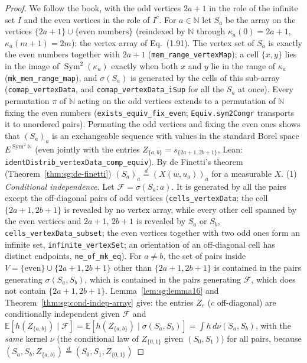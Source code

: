 \begin{proof}
  \leanok
{}
We follow the book, with the odd vertices $2a+1$ in the role of the infinite set $I$ and the even vertices in the role of $I^c$. For $a\in\mathbb N$ let $S_a$ be the array on the vertices $\{2a+1\}\cup\{\text{even numbers}\}$ (reindexed by $\mathbb N$ through
$\kappa_a(0)=2a+1$, $\kappa_a(m+1)=2m$): the vertex array of Eq.~(1.91). The vertex set of $S_a$ is exactly the even numbers together with $2a+1$ (\texttt{mem\_range\_vertexMap}); a cell $\{x,y\}$ lies in the image of $\operatorname{Sym}^2(\kappa_a)$ exactly when both $x$ and $y$ lie in the range of $\kappa_a$ (\texttt{mk\_mem\_range\_map}), and $\sigma(S_a)$ is generated by the cells of this sub-array (\texttt{comap\_vertexData}, and \texttt{comap\_vertexData\_iSup} for all the $S_a$ at once). Every permutation $\pi$ of $\mathbb N$ acting on the odd vertices extends to a permutation of $\mathbb N$ fixing the even numbers (\texttt{exists\_equiv\_fix\_even}; \texttt{Equiv.sym2Congr} transports it to unordered pairs). Permuting the odd vertices and fixing the even ones shows that $(S_a)_a$ is an exchangeable sequence with values in the standard Borel space $E^{\operatorname{Sym}^2\mathbb N}$ (even jointly with the entries
$Z_{\{a,b\}}=s_{\{2a+1,2b+1\}}$, Lean: \texttt{identDistrib\_vertexData\_comp\_equiv}). By de Finetti's theorem (Theorem~\ref{thm:sg:de-finetti}) $(S_a)_a\overset d=(X(w,u_a))_a$ for a measurable $X$.
(1) \emph{Conditional independence.} Let $\mathscr F=\sigma(S_a:a)$. It is generated by all the pairs except the off-diagonal pairs of odd vertices (\texttt{cells\_vertexData}: the cell $\{2a+1,2b+1\}$ is revealed by no vertex array, while every other cell spanned by the even vertices and $2a+1$, $2b+1$ is revealed by $S_a$ or $S_b$, \texttt{cells\_vertexData\_subset}; the even vertices together with two odd ones form an infinite set, \texttt{infinite\_vertexSet}; an orientation of an off-diagonal cell has distinct endpoints, \texttt{ne\_of\_mk\_eq}). For $a\ne b$, the set of pairs inside $V=\{\text{even}\}\cup\{2a+1,2b+1\}$ other than $\{2a+1,2b+1\}$ is contained in the pairs
generating $\sigma(S_a,S_b)$, which is contained in the pairs generating $\mathscr F$, which does not contain $\{2a+1,2b+1\}$. Lemma~\ref{lem:sg:lemma16} and Theorem~\ref{thm:sg:cond-indep-array} give: the entries $Z_c$ ($c$ off-diagonal) are conditionally independent given $\mathscr F$ and
$\mathbb E[h(Z_{\{a,b\}})\mid\mathscr F]=\mathbb E[h(Z_{\{a,b\}})\mid\sigma(S_a,S_b)]=\int h\,d\nu(S_a,S_b)$, with the \emph{same} kernel $\nu$ (the conditional law of $Z_{\{0,1\}}$ given $(S_0,S_1)$) for all pairs, because $(S_a,S_b,Z_{\{a,b\}})\overset d=(S_0,S_1,Z_{\{0,1\}})$

\end{proof}
